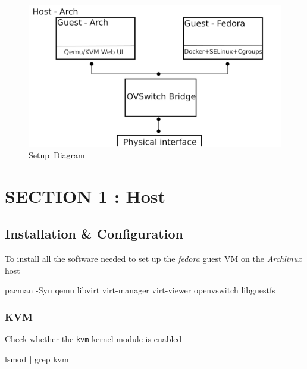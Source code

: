 \documentclass[
  14pt,
  english,
  a4paper,
]{scrreprt}
\newenvironment{Shaded}{}{}
\newcommand{\ExtensionTok}[1]{#1}
\newcommand{\FunctionTok}[1]{\textcolor[rgb]{0.02,0.16,0.49}{#1}}
\newcommand{\KeywordTok}[1]{\textcolor[rgb]{0.00,0.44,0.13}{\textbf{#1}}}
\newcommand{\NormalTok}[1]{#1}
\begin{document}
\begin{figure}
\hypertarget{fig:netdiagram}{%
\centering
\includegraphics{figures/network_diagram.png}
\caption{Setup~Diagram}\label{fig:netdiagram}
}
\end{figure}

\hypertarget{sec:host}{%
\section{SECTION 1 : Host}\label{sec:host}}

\hypertarget{installation-configuration}{%
\subsection{Installation \&
Configuration}\label{installation-configuration}}

To install all the software needed to set up the \emph{fedora} guest VM
on the \emph{Archlinux} host

\begin{Shaded}
\begin{Highlighting}[]
\ExtensionTok{pacman}\NormalTok{ {-}Syu qemu libvirt virt{-}manager virt{-}viewer openvswitch libguestfs}
\end{Highlighting}
\end{Shaded}

\hypertarget{kvm-1}{%
\subsubsection{KVM}\label{kvm-1}}

Check whether the \texttt{kvm} kernel module is enabled

\begin{Shaded}
\begin{Highlighting}[]
\FunctionTok{lsmod} \KeywordTok{|} \FunctionTok{grep}\NormalTok{ kvm}
\end{Highlighting}
\end{Shaded}
\end{document}
